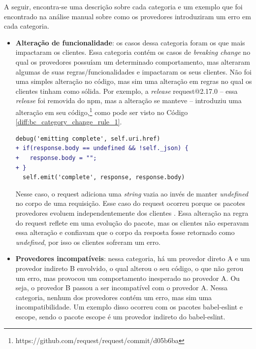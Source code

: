 A seguir, encontra-se uma descrição sobre cada categoria e um exemplo que foi encontrado na análise manual sobre como os provedores introduziram um erro em cada categoria.

\begin{itemize}
    \item \textbf{Alteração de funcionalidade}: os casos dessa categoria foram os que mais impactaram os clientes. Essa categoria contém os casos de \textit{breaking change} no qual os provedores possuíam um determinado comportamento, mas alteraram algumas de suas regras/funcionalidades e impactaram os seus clientes. Não foi uma simples alteração no código, mas sim uma alteração em regras no qual os clientes tinham como sólida. Por exemplo, a \textit{release} \textsf{request@2.17.0} -- essa \textit{release} foi removida do \textsf{npm}, mas a alteração se manteve -- introduziu uma alteração em seu código,\footnote{https://github.com/request/request/commit/d05b6ba} como pode ser visto no Código \ref{diff:bc_category_change_rule_1}.

    \begin{lstlisting}[numbers=none, language=diff, label=diff:bc_category_change_rule_1, caption={Exemplo da categoria \textit{Alteração de funcionalidade}}]
  debug('emitting complete', self.uri.href)
+ if(response.body == undefined && !self._json) {
+   response.body = "";
+ }
  self.emit('complete', response, response.body)
    \end{lstlisting}

    Nesse caso, o \textsf{request} adiciona uma \textit{string} vazia ao invés de manter \textit{undefined} no corpo de uma requisição. Esse caso do \textsf{request} ocorreu porque os pacotes provedores evoluem independentemente dos clientes \cite{Foo:2018:ESC:3236024.3275535}. Essa alteração na regra do \textsf{request} reflete em uma evolução do pacote, mas os clientes não esperavam essa alteração e confiavam que o corpo da resposta fosse retornado como \textit{undefined}, por isso os clientes sofreram um erro.

    \item \textbf{Provedores incompatíveis}: nessa categoria, há um provedor direto \textsf{A} e um provedor indireto \textsf{B} envolvido, o qual alterou o seu código, o que não gerou um erro, mas provocou um comportamento inesperado no provedor \textsf{A}. Ou seja, o provedor \textsf{B} passou a ser incompatível com o provedor \textsf{A}. Nessa categoria, nenhum dos provedores contém um erro, mas sim uma incompatibilidade. Um exemplo disso ocorreu com os pacotes \textsf{babel-eslint} e \textsf{escope}, sendo o pacote \textsf{escope} é um provedor indireto do \textsf{babel-eslint}.


\end{itemize}
